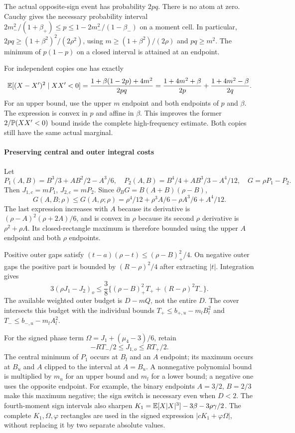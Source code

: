 The actual opposite-sign event has probability $2pq$.
There is no atom at zero. Cauchy gives the necessary probability interval
$2m_-^2/(1+\beta_+)\le p\le1-2m_-^2/(1-\beta_-)$ on a moment cell.
In particular, $2pq\ge(1+\beta^2)^2/(2\rho^2)$, using
$m\ge(1+\beta^2)/(2\rho)$ and $pq\ge m^2$. The minimum of
$p(1-p)$ on a closed interval is attained at an endpoint.

For independent copies one has exactly
\[
 \mathbb E[(X-X')^2\mid XX'<0]
 =\frac{1+\beta(1-2p)+4m^2}{2pq}
 =\frac{1+4m^2+\beta}{2p}
  +\frac{1+4m^2-\beta}{2q}.
\]
For an upper bound, use the upper $m$ endpoint and both endpoints of
$p$ and $\beta$. The expression is convex in $p$ and affine in $\beta$.
This improves the former $2/\mathbb P(XX'<0)$ bound inside the complete high-frequency
estimate. Both copies still have the same actual marginal.

\paragraph{Preserving central and outer integral costs}
Let
\[
 P_1(A,B)=B^3/3+AB^2/2-A^3/6,\quad
 P_2(A,B)=B^4/4+AB^3/3-A^4/12,\quad G=\rho P_1-P_2.
\]
Then $J_{1,c}=mP_1$, $J_{2,c}=mP_2$. Since
$\partial_BG=B(A+B)(\rho-B)$,
\[
 G(A,B;\rho)\le G(A,\rho;\rho)
 =\rho^4/12+\rho^3A/6-\rho A^3/6+A^4/12.
\]
The last expression increases with $A$ because its derivative is
$(\rho-A)^2(\rho+2A)/6$, and is convex in $\rho$ because its second
$\rho$ derivative is $\rho^2+\rho A$. Its closed-rectangle maximum is
therefore bounded using the upper $A$ endpoint and both $\rho$ endpoints.

Positive outer gaps satisfy
$(t-a)(\rho-t)\le(\rho-B)_+^2/4$. On negative outer gaps the positive
part is bounded by $(R-\rho)^2/4$ after extracting $|t|$.
Integration gives
\[
 3(\rho J_1-J_2)_o
 \le\frac38\{(\rho-B)_+^2T_++(R-\rho)^2T_-\}.
\]
The available weighted outer budget is $D-mQ$, not the entire $D$.
The cover intersects this budget with the individual bounds
$T_+\le b_{+,u}-m_lB_l^2$ and $T_-\le b_{-,u}-m_lA_l^2$.

For the signed phase term $\Omega=J_1+(\mu_4-3)/6$, retain
\[
 -RT_-/2\le J_{1,o}\le RT_+/2.
\]
The central minimum of $P_1$ occurs at $B_l$ and an $A$ endpoint;
its maximum occurs at $B_u$ and $A$ clipped to the interval at $A=B_u$.
A nonnegative polynomial bound is multiplied by $m_u$ for an upper
bound and $m_l$ for a lower bound; a negative one uses the opposite
endpoint. For example, the binary endpoints $A=3/2$, $B=2/3$ make this
maximum negative; the sign switch is necessary even when $D<2$.
The fourth-moment sign intervals also sharpen
$K_1=\mathbb E[X|X|^3]-3\beta-3\rho\gamma/2$.
The complete $K_1,\Omega,\varphi$ rectangles are used in the signed expression
$|cK_1+\varphi\Omega|$, without replacing it by two separate absolute values.



